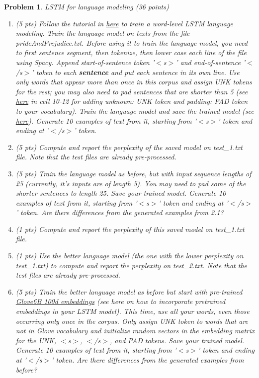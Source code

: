 \documentclass{article}
\newtheorem{problem}{Problem}
\begin{document}
\begin{problem} LSTM for language modeling (36 points) 
\begin{enumerate}
    \item (5 pts) Follow the tutorial in \href{https://www.analyticsvidhya.com/blog/2020/08/build-a-natural-language-generation-nlg-system-using-pytorch/}{here} to train a word-level LSTM language modeling. Train the language model on texts from the file prideAndPrejudice.txt. Before using it to train the language model, you need to first sentence segment, then tokenize, then lower case each line of the file using Spacy. Append start-of-sentence token '$<$s$>$' and end-of-sentence '$<$/s$>$' token to each \textbf{sentence} and put each sentence in its own line. Use only words that appear more than once in this corpus and assign UNK tokens for the rest; you may also need to pad sentences that are shorter than 5 (see \href{https://github.com/gabrielloye/LSTM_Sentiment-Analysis/blob/master/main.ipynb}{here} in cell 10-12 for adding unknown: UNK token and padding: PAD token to your vocabulary). Train the language model and save the trained model (see \href{https://pytorch.org/tutorials/beginner/saving_loading_models.html}{here}). Generate 10 examples of text from it, starting from '$<$s$>$' token and ending at '$<$/s$>$' token.
    \item (5 pts) Compute and report the perplexity of the saved model on test\_1.txt file. Note that the test files are already pre-processed. 
    \item (5 pts) Train the language model as before, but with input sequence lengths of 25 (currently, it's inputs are of length 5). You may need to pad some of the shorter sentences to length 25. Save your trained model. Generate 10 examples of text from it, starting from '$<$s$>$' token and ending at '$<$/s$>$' token. Are there differences from the generated examples from 2.1?
    \item (1 pts) Compute and report the perplexity of this saved model on test\_1.txt file.
    \item (1 pts) Use the better language model (the one with the lower perplexity on test\_1.txt) to compute and report the perplexity on test\_2.txt. Note that the test files are already pre-processed. 
    \item (5 pts) Train the better language model as before but start with  pre-trained \href{https://nlp.stanford.edu/projects/glove/}{Glove6B 100d embeddings} (see here on how to incorporate pretrained embeddings in your LSTM model). This time, use all your words, even those occurring only once in the corpus. Only assign UNK token to words that are not in Glove vocabulary and initialize random vectors in the embedding matrix for the UNK, $<$s$>$, $<$/s$>$, and PAD tokens. Save your trained model. Generate 10 examples of text from it, starting from '$<$s$>$' token and ending at '$<$/s$>$' token. Are there differences from the generated examples from before?

\end{enumerate}
\end{problem}
\end{document}
